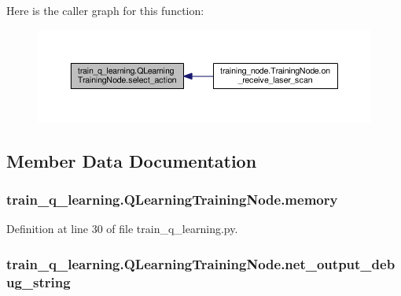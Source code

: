Here is the caller graph for this function\+:
\nopagebreak
\begin{figure}[H]
\begin{center}
\leavevmode
\includegraphics[width=350pt]{classtrain__q__learning_1_1_q_learning_training_node_a5dc01997b295135bb2aebb1e7736bf4d_icgraph}
\end{center}
\end{figure}




\subsection{Member Data Documentation}
\subsubsection[{\texorpdfstring{memory}{memory}}]{\setlength{\rightskip}{0pt plus 5cm}train\+\_\+q\+\_\+learning.\+Q\+Learning\+Training\+Node.\+memory}\hypertarget{classtrain__q__learning_1_1_q_learning_training_node_a87fe164a17db112700c39e84a767dcd4}{}\label{classtrain__q__learning_1_1_q_learning_training_node_a87fe164a17db112700c39e84a767dcd4}


Definition at line 30 of file train\+\_\+q\+\_\+learning.\+py.

\subsubsection[{\texorpdfstring{net\+\_\+output\+\_\+debug\+\_\+string}{net_output_debug_string}}]{\setlength{\rightskip}{0pt plus 5cm}train\+\_\+q\+\_\+learning.\+Q\+Learning\+Training\+Node.\+net\+\_\+output\+\_\+debug\+\_\+string}\hypertarget{classtrain__q__learning_1_1_q_learning_training_node_ad1f8bb7b1ca27f25e4e59abd71df4efe}{}\label{classtrain__q__learning_1_1_q_learning_training_node_ad1f8bb7b1ca27f25e4e59abd71df4efe}


